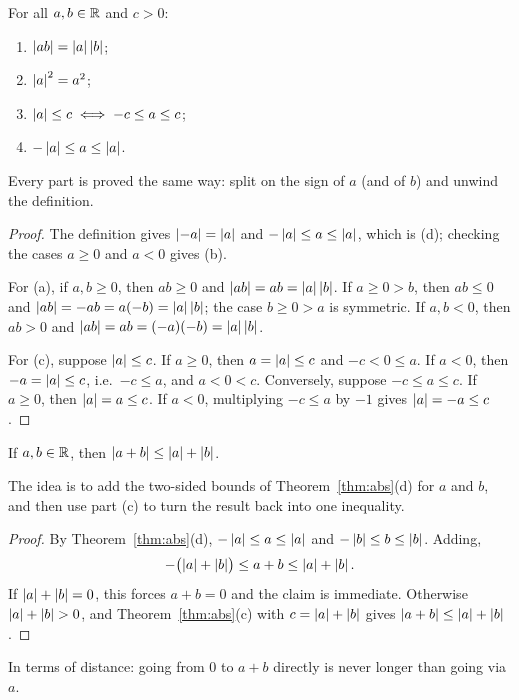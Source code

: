 \begin{nthm}\label{thm:abs}
  For all $a, b \in \mathbb{R}$ and $c > 0$:
  \begin{enumerate}[label=(\alph*)]
    \item $\left\lvert ab\right\rvert = \left\lvert a\right\rvert\left\lvert b\right\rvert$;
    \item $\left\lvert a\right\rvert^2 = a^2$;
    \item $\left\lvert a\right\rvert \leq c \iff -c \leq a \leq c$;
    \item $-\left\lvert a\right\rvert \leq a \leq \left\lvert a\right\rvert$.
  \end{enumerate}
\end{nthm}
Every part is proved the same way: split on the sign of $a$ (and of $b$) and
unwind the definition.

\begin{proof}
  The definition gives $\left\lvert -a\right\rvert = \left\lvert a\right\rvert$ and $-\left\lvert a\right\rvert \leq a \leq \left\lvert a\right\rvert$,
  which is (d); checking the cases $a \geq 0$ and $a < 0$ gives (b).

  For (a), if $a, b \geq 0$, then $ab \geq 0$ and $\left\lvert ab\right\rvert = ab = \left\lvert a\right\rvert\left\lvert b\right\rvert$.
  If $a \geq 0 > b$, then $ab \leq 0$ and $\left\lvert ab\right\rvert = -ab = a(-b) = \left\lvert a\right\rvert\left\lvert b\right\rvert$;
  the case $b \geq 0 > a$ is symmetric. If $a, b < 0$, then $ab > 0$ and
  $\left\lvert ab\right\rvert = ab = (-a)(-b) = \left\lvert a\right\rvert\left\lvert b\right\rvert$.

  For (c), suppose $\left\lvert a\right\rvert \leq c$. If $a \geq 0$, then $a = \left\lvert a\right\rvert \leq c$
  and $-c < 0 \leq a$. If $a < 0$, then $-a = \left\lvert a\right\rvert \leq c$, i.e.\
  $-c \leq a$, and $a < 0 < c$. Conversely, suppose $-c \leq a \leq c$. If
  $a \geq 0$, then $\left\lvert a\right\rvert = a \leq c$. If $a < 0$, multiplying $-c \leq a$
  by $-1$ gives $\left\lvert a\right\rvert = -a \leq c$.
\end{proof}

\begin{nprop}\label{prop:triangle}
  If $a, b \in \mathbb{R}$, then $\left\lvert a + b\right\rvert \leq \left\lvert a\right\rvert + \left\lvert b\right\rvert$.
\end{nprop}
The idea is to add the two-sided bounds of Theorem~\ref{thm:abs}(d) for $a$
and $b$, and then use part (c) to turn the result back into one inequality.

\begin{proof}
  By Theorem~\ref{thm:abs}(d), $-\left\lvert a\right\rvert \leq a \leq \left\lvert a\right\rvert$ and
  $-\left\lvert b\right\rvert \leq b \leq \left\lvert b\right\rvert$. Adding,
  \[
    -\bigl(\left\lvert a\right\rvert + \left\lvert b\right\rvert\bigr) \leq a + b \leq \left\lvert a\right\rvert + \left\lvert b\right\rvert.
  \]
  If $\left\lvert a\right\rvert + \left\lvert b\right\rvert = 0$, this forces $a + b = 0$ and the claim is
  immediate. Otherwise $\left\lvert a\right\rvert + \left\lvert b\right\rvert > 0$, and
  Theorem~\ref{thm:abs}(c) with $c = \left\lvert a\right\rvert + \left\lvert b\right\rvert$ gives
  $\left\lvert a + b\right\rvert \leq \left\lvert a\right\rvert + \left\lvert b\right\rvert$.
\end{proof}
In terms of distance: going from $0$ to $a + b$ directly is never longer than
going via $a$.

